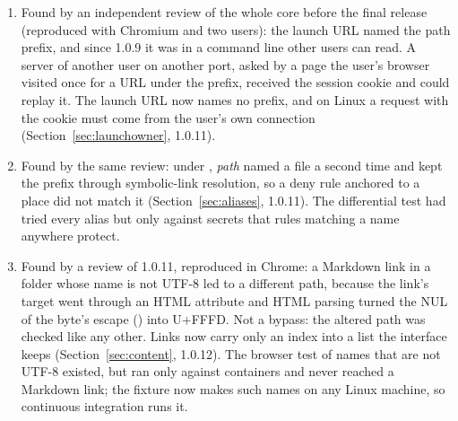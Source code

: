 \begin{enumerate}
        compared owners by uid only, so a lookup that matched \texttt{fsb}'s own end of the
        connection, letting anyone through, would have passed them; they now compare socket
        inodes.
  \item Found by an independent review of the whole core before the final release
        (reproduced with Chromium and two users): the launch URL named the path prefix,
        and since 1.0.9 it was in a command line other users can read.  A server of another
        user on another port, asked by a page the user's browser visited once for a URL
        under the prefix, received the session cookie and could replay it.  The launch URL
        now names no prefix, and on Linux a request with the cookie must come from the
        user's own connection (Section~\ref{sec:launchowner}, 1.0.11).
  \item Found by the same review: under , \emph{path}
        named a file a second time and kept the prefix through symbolic-link resolution,
        so a deny rule anchored to a place did not match it (Section~\ref{sec:aliases},
        1.0.11).  The differential test had tried every alias but only against secrets that
        rules matching a name anywhere protect.
  \item Found by a review of 1.0.11, reproduced in Chrome: a Markdown link in a folder
        whose name is not UTF-8 led to a different path, because the link's target went
        through an HTML attribute and HTML parsing turned the NUL of the byte's escape
        () into U+FFFD.  Not a bypass: the altered path was checked like any
        other.  Links now carry only an index into a list the interface keeps
        (Section~\ref{sec:content}, 1.0.12).  The browser test of names that are not UTF-8
        existed, but ran only against containers and never reached a Markdown link; the
        fixture now makes such names on any Linux machine, so continuous integration runs it.
\end{enumerate}


